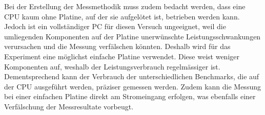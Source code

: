 \par

Bei der Erstellung der Messmethodik muss zudem bedacht werden, dass eine CPU kaum ohne Platine, auf der sie aufgelötet ist, betrieben werden kann. Jedoch ist ein vollständiger PC für diesen Versuch ungeeignet, weil die umliegenden Komponenten auf der Platine unerwünschte Leistungsschwankungen verursachen und die Messung verfälschen könnten. Deshalb wird für das Experiment eine möglichst einfache Platine verwendet. Diese weist weniger Komponenten auf, weshalb der Leistungsverbrauch regelmässiger ist. Dementsprechend kann der Verbrauch der unterschiedlichen Benchmarks, die auf der CPU ausgeführt werden, präziser gemessen werden. Zudem kann die Messung bei einer einfachen Platine direkt am Stromeingang erfolgen, was ebenfalls einer Verfälschung der Messresultate vorbeugt.
